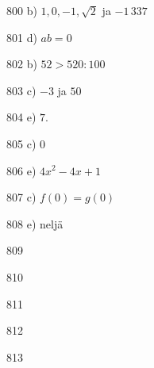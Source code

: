 \begin{Vastaus}{800}
	b) $1, 0, -1, \sqrt{2}$ ja $-1\,337$
	
\end{Vastaus}
\begin{Vastaus}{801}
d) $ab = 0$
	
\end{Vastaus}
\begin{Vastaus}{802}
b) $52 > 520:100$
	
\end{Vastaus}
\begin{Vastaus}{803}
c) $-3$ ja $50$ %
	
\end{Vastaus}
\begin{Vastaus}{804}
e) $7.$
	
\end{Vastaus}
\begin{Vastaus}{805}
c) $0$
	
\end{Vastaus}
\begin{Vastaus}{806}
e) $4x^2-4x+1$
	
\end{Vastaus}
\begin{Vastaus}{807}
	c) $f(0) = g(0)$
	
\end{Vastaus}
\begin{Vastaus}{808}
	e) neljä
	
\end{Vastaus}
\begin{Vastaus}{809}
	
\end{Vastaus}
\begin{Vastaus}{810}
	
\end{Vastaus}
\begin{Vastaus}{811}
    
\end{Vastaus}
\begin{Vastaus}{812}
    
\end{Vastaus}
\begin{Vastaus}{813}
    
\end{Vastaus}
